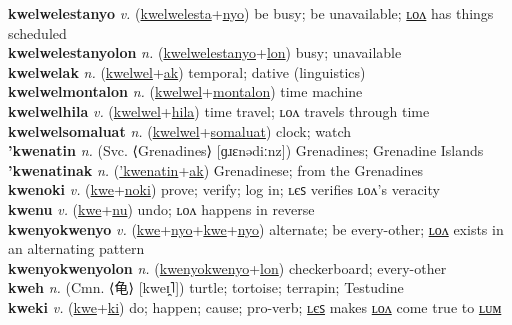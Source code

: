\textbf{kwelwelestanyo} \textit{v.} (\hyperref[kwelwelesta]{kwelwelesta}+\hyperref[nyo]{nyo})
be busy; be unavailable; \hyperref[kwelwelestanyolon]{ʟᴏᴧ} has things scheduled \label{kwelwelestanyo} \\
\textbf{kwelwelestanyolon} \textit{n.} (\hyperref[kwelwelestanyo]{kwelwelestanyo}+\hyperref[lon]{lon})
busy; unavailable \label{kwelwelestanyolon} \\
\textbf{kwelwelak} \textit{n.} (\hyperref[kwelwel]{kwelwel}+\hyperref[ak]{ak})
temporal; dative (linguistics) \label{kwelwelak} \\
\textbf{kwelwelmontalon} \textit{n.} (\hyperref[kwelwel]{kwelwel}+\hyperref[montalon]{montalon})
time machine \label{kwelwelmontalon} \\
\textbf{kwelwelhila} \textit{v.} (\hyperref[kwelwel]{kwelwel}+\hyperref[hila]{hila})
time travel; ʟᴏᴧ travels through time \label{kwelwelhila} \\
\textbf{kwelwelsomaluat} \textit{n.} (\hyperref[kwelwel]{kwelwel}+\hyperref[somaluat]{somaluat})
clock; watch \label{kwelwelsomaluat} \\
\textbf{'kwenatin} \textit{n.} (Svc. ⟨Grenadines⟩ [ɡɹɛnədiːnz])
Grenadines; Grenadine Islands \label{'kwenatin} \\
\textbf{'kwenatinak} \textit{n.} (\hyperref['kwenatin]{'kwenatin}+\hyperref[ak]{ak})
Grenadinese; from the Grenadines \label{'kwenatinak} \\
\textbf{kwenoki} \textit{v.} (\hyperref[kwe]{kwe}+\hyperref[noki]{noki})
prove; verify; log in; ʟєꜱ verifies ʟᴏᴧ's veracity \label{kwenoki} \\
\textbf{kwenu} \textit{v.} (\hyperref[kwe]{kwe}+\hyperref[nu]{nu})
undo; ʟᴏᴧ happens in reverse \label{kwenu} \\
\textbf{kwenyokwenyo} \textit{v.} (\hyperref[kwe]{kwe}+\hyperref[nyo]{nyo}+\hyperref[kwe]{kwe}+\hyperref[nyo]{nyo})
alternate; be every-other; \hyperref[kwenyokwenyolon]{ʟᴏᴧ} exists in an alternating pattern \label{kwenyokwenyo} \\
\textbf{kwenyokwenyolon} \textit{n.} (\hyperref[kwenyokwenyo]{kwenyokwenyo}+\hyperref[lon]{lon})
checkerboard; every-other \label{kwenyokwenyolon} \\
\textbf{kweh} \textit{n.} (Cmn. ⟨龟⟩ [kweɪ̯˥])
turtle; tortoise; terrapin; Testudine \label{kweh} \\
\textbf{kweki} \textit{v.} (\hyperref[kwe]{kwe}+\hyperref[ki]{ki})
do; happen; cause; pro-verb; \hyperref[kwekiles]{ʟєꜱ} makes \hyperref[kwekilon]{ʟᴏᴧ} come true to \hyperref[kwekilum]{ʟᴜᴍ} \label{kweki} \\
